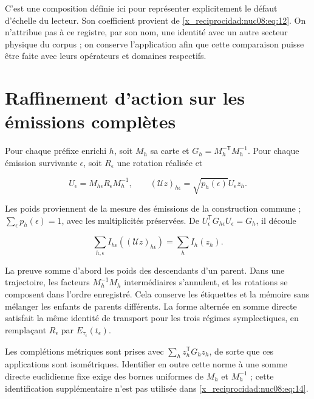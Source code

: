 C’est une composition définie ici pour représenter explicitement le défaut d’échelle du lecteur. Son coefficient provient de \eqref{x_reciprocidad:nuc08:eq:12}. On n’attribue pas à ce registre, par son nom, une identité avec un autre secteur physique du corpus ; on conserve l’application afin que cette comparaison puisse être faite avec leurs opérateurs et domaines respectifs.

\section{Raffinement d’action sur les émissions complètes}

Pour chaque préfixe enrichi \(h\), soit \(M_h\) sa carte et \(G_h=M_h^{-\mathsf T}M_h^{-1}\). Pour chaque émission survivante \(\epsilon\), soit \(R_\epsilon\) une rotation réalisée et


\[
U_\epsilon=M_{h\epsilon}R_\epsilon M_h^{-1},\qquad
(\mathscr U z)_{h\epsilon}=\sqrt{p_h(\epsilon)}U_\epsilon z_h.
\]

Les poids proviennent de la mesure des émissions de la construction commune ; \(\sum_\epsilon p_h(\epsilon)=1\), avec les multiplicités préservées. De \(U_\epsilon^\mathsf TG_{h\epsilon}U_\epsilon=G_h\), il découle

\begin{equation}
\sum_{h,\epsilon}I_{h\epsilon}((\mathscr U z)_{h\epsilon})
=\sum_h I_h(z_h).
\label{x_reciprocidad:nuc08:eq:14}
\end{equation}

La preuve somme d’abord les poids des descendants d’un parent. Dans une trajectoire, les facteurs \(M_h^{-1}M_h\) intermédiaires s’annulent, et les rotations se composent dans l’ordre enregistré. Cela conserve les étiquettes et la mémoire sans mélanger les enfants de parents différents. La forme alternée en somme directe satisfait la même identité de transport pour les trois régimes symplectiques, en remplaçant \(R_\epsilon\) par \(E_{\tau_\epsilon}(t_\epsilon)\).


Les complétions métriques sont prises avec \(\sum_h z_h^\mathsf TG_hz_h\), de sorte que ces applications sont isométriques. Identifier en outre cette norme à une somme directe euclidienne fixe exige des bornes uniformes de \(M_h\) et \(M_h^{-1}\) ; cette identification supplémentaire n’est pas utilisée dans \eqref{x_reciprocidad:nuc08:eq:14}.
